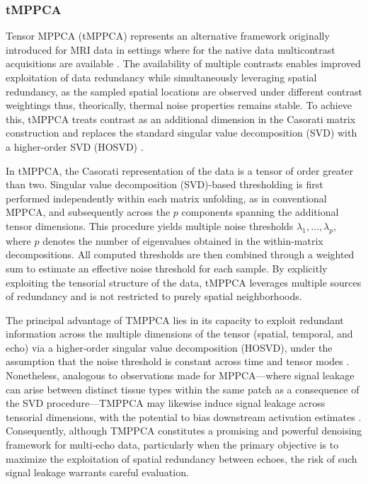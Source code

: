 \subsubsection{tMPPCA}

Tensor MPPCA (tMPPCA) represents an alternative framework originally introduced for MRI data in settings where for the native data  multicontrast acquisitions are available \citep{olesenTensorDenoisingMultidimensional2023, chenTensorImageEnhancement2020, zhangDenoiseDiffusionweightedImages2017}. The availability of multiple contrasts enables improved exploitation of data redundancy while simultaneously leveraging spatial redundancy, as the sampled spatial locations are observed under different contrast weightings thus, theorically, thermal noise properties remains stable. To achieve this, tMPPCA treats contrast as an additional dimension in the Casorati matrix construction and replaces the standard singular value decomposition (SVD) with a higher-order SVD (HOSVD) \citep{wangModifiedHigherorderSingular2020}.

In tMPPCA, the Casorati representation of the data is a tensor of order greater than two. Singular value decomposition (SVD)-based thresholding is first performed independently within each matrix unfolding, as in conventional MPPCA, and subsequently across the $p$ components spanning the additional tensor dimensions. This procedure yields multiple noise thresholds $\lambda_1,\dots,\lambda_p$, where $p$ denotes the number of eigenvalues obtained in the within-matrix decompositions. All computed thresholds are then combined through a weighted sum to estimate an effective noise threshold for each sample. By explicitly exploiting the tensorial structure of the data, tMPPCA leverages multiple sources of redundancy and is not restricted to purely spatial neighborhoods.

The principal advantage of TMPPCA lies in its capacity to exploit redundant information across the multiple dimensions of the tensor (spatial, temporal, and echo) via a higher‑order singular value decomposition (HOSVD), under the assumption that the noise threshold is constant across time and tensor modes \citep{olesenTensorDenoisingMultidimensional2023}. Nonetheless, analogous to observations made for MPPCA—where signal leakage can arise between distinct tissue types within the same patch as a consequence of the SVD procedure—TMPPCA may likewise induce signal leakage across tensorial dimensions, with the potential to bias downstream activation estimates \citep{fernandesMPPCADenoisingFMRI2023a}. Consequently, although TMPPCA constitutes a promising and powerful denoising framework for multi‑echo data, particularly when the primary objective is to maximize the exploitation of spatial redundancy between echoes, the risk of such signal leakage warrants careful evaluation.

